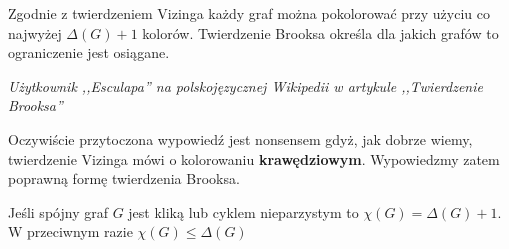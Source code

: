 \epigraph{
	Zgodnie z twierdzeniem Vizinga każdy graf można pokolorować przy użyciu co najwyżej \(\Delta(G)+1\) kolorów. Twierdzenie Brooksa określa dla jakich grafów to ograniczenie jest osiągane.
}{\textit{
		Użytkownik ,,Esculapa'' na polskojęzycznej Wikipedii w artykule ,,Twierdzenie Brooksa''}}

Oczywiście przytoczona wypowiedź jest nonsensem gdyż, jak dobrze wiemy, twierdzenie Vizinga mówi o kolorowaniu \textbf{krawędziowym}.
Wypowiedzmy zatem poprawną formę twierdzenia Brooksa.

\begin{theorem}[Brooks]
	Jeśli spójny graf \(G\) jest kliką lub cyklem nieparzystym to \(\chi(G) = \Delta(G) + 1\).
	W przeciwnym razie \(\chi(G) \leq \Delta(G)\)
\end{theorem}

